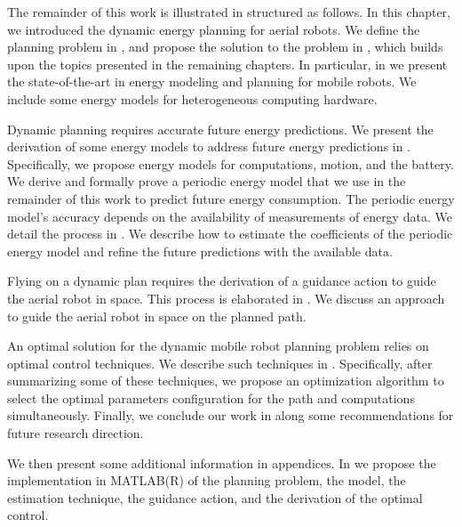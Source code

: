 The remainder of this work is illustrated in  structured as follows. In this chapter, we introduced the dynamic energy planning for aerial robots. We define the planning problem in , and propose the solution to the problem in , which builds upon the topics presented in the remaining chapters. In particular, in  we present the state-of-the-art in energy modeling and planning for mobile robots. We include some energy models for heterogeneous computing hardware.

Dynamic planning requires accurate future energy predictions. We present the derivation of some energy models to address future energy predictions in . Specifically, we propose energy models for computations, motion, and the battery. We derive and formally prove a periodic energy model that we use in the remainder of this work to predict future energy consumption. The periodic energy model's accuracy depends on the availability of measurements of energy data. We detail the process in . We describe how to estimate the coefficients of the periodic energy model and refine the future predictions with the available data.

Flying on a dynamic plan requires the derivation of a guidance action to guide the aerial robot in space. This process is elaborated in . We discuss an approach to guide the aerial robot in space on the planned path. 

An optimal solution for the dynamic mobile robot planning problem relies on optimal control techniques. We describe such techniques in . Specifically, after summarizing some of these techniques, we propose an optimization algorithm to select the optimal parameters configuration for the path and computations simultaneously. Finally, we conclude our work in  along some recommendations for future research direction. 

We then present some additional information in appendices. In  we propose the implementation in MATLAB(R) of the planning problem, the model, the estimation technique, the guidance action, and the derivation of the optimal control. 


